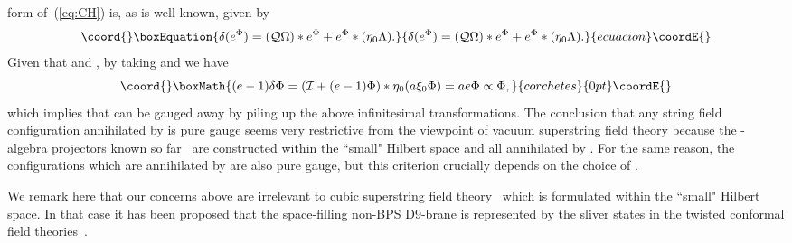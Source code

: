 \documentclass[a4paper,12pt]{article}
\providecommand{\cI}{\mathcal{I}}
\providecommand{\cQ}{\mathcal{Q}}
\begin{document}
form of~(\ref{eq:CH}) is, as is well-known, given by 
\begin{equation}\coord{}\boxEquation{
\delta (e^{\Phi})=(\cQ\Omega) *e^{\Phi}+e^{\Phi}*(\eta_0\Lambda). \label{eq:CJ}
}{
\delta (e^{\Phi})=(\cQ\Omega) *e^{\Phi}+e^{\Phi}*(\eta_0\Lambda). }{ecuacion}\coordE{}\end{equation}
Given that \myHighlight{$\Phi *\Phi=\Phi$}\coordHE{} and \coordHE{}, by taking \coordHE{} and \coordHE{} 
\coordHE{} we have
\[\coord{}\boxMath{ (e-1)\delta\Phi=\left(\cI+(e-1)\Phi\right) *\eta_0(a\xi_0\Phi)=ae\Phi\propto\Phi, }{corchetes}{0pt}\coordE{}\]
which implies that \myHighlight{$\Phi$}\coordHE{} can be gauged away by piling up the above infinitesimal transformations. 
The conclusion that any string field configuration annihilated by \coordHE{} is pure gauge seems very 
restrictive from the viewpoint of vacuum superstring field theory because the \myHighlight{$*$}\coordHE{}-algebra projectors 
known so far~\cite{GRSZ3,Schnabl} are constructed within the ``small"  Hilbert space and all annihilated 
by \coordHE{}. For the same reason, the configurations \myHighlight{$\Phi$}\coordHE{} which are annihilated by \myHighlight{$\cQ$}\coordHE{} are 
also pure gauge, but this criterion crucially depends on the choice of \myHighlight{$\cQ$}\coordHE{}. 
\medskip

We remark here that our concerns above are irrelevant to 
cubic superstring field theory~\cite{CSSFT,ABGKM,NSms,ABG,NSgs} 
which is formulated within the ``small" Hilbert space. In that case it has been proposed that 
the space-filling non-BPS D9-brane is represented by the sliver states in the 
twisted conformal field theories~\cite{NSgs}.
\end{document}
